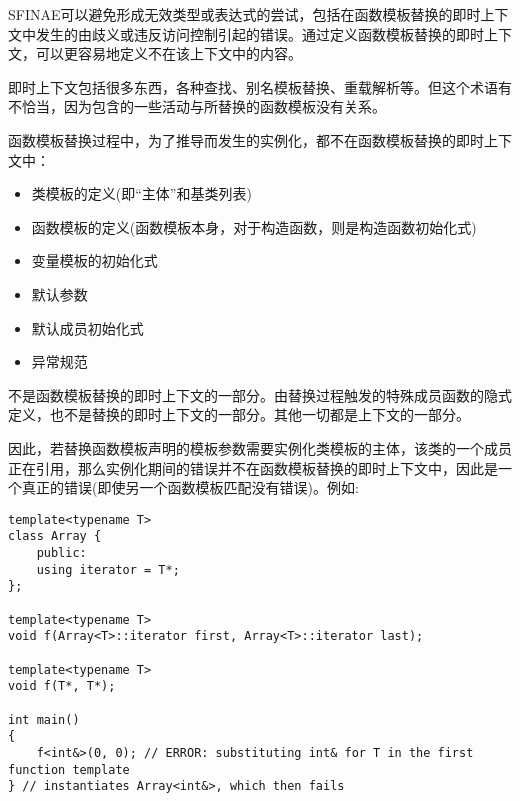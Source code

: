 
SFINAE可以避免形成无效类型或表达式的尝试，包括在函数模板替换的即时上下文中发生的由歧义或违反访问控制引起的错误。通过定义函数模板替换的即时上下文，可以更容易地定义不在该上下文中的内容。

\begin{tcolorbox}[colback=webgreen!5!white,colframe=webgreen!75!black]
\hspace*{0.75cm}即时上下文包括很多东西，各种查找、别名模板替换、重载解析等。但这个术语有不恰当，因为包含的一些活动与所替换的函数模板没有关系。
\end{tcolorbox}

函数模板替换过程中，为了推导而发生的实例化，都不在函数模板替换的即时上下文中：

\begin{itemize}
\item 
类模板的定义(即“主体”和基类列表)

\item 
函数模板的定义(函数模板本身，对于构造函数，则是构造函数初始化式)

\item 
变量模板的初始化式

\item 
默认参数

\item 
默认成员初始化式

\item 
异常规范
\end{itemize}

不是函数模板替换的即时上下文的一部分。由替换过程触发的特殊成员函数的隐式定义，也不是替换的即时上下文的一部分。其他一切都是上下文的一部分。

因此，若替换函数模板声明的模板参数需要实例化类模板的主体，该类的一个成员正在引用，那么实例化期间的错误并不在函数模板替换的即时上下文中，因此是一个真正的错误(即使另一个函数模板匹配没有错误)。例如:

\begin{lstlisting}[style=styleCXX]
template<typename T>
class Array {
	public:
	using iterator = T*;
};

template<typename T>
void f(Array<T>::iterator first, Array<T>::iterator last);

template<typename T>
void f(T*, T*);

int main()
{
	f<int&>(0, 0); // ERROR: substituting int& for T in the first function template
} // instantiates Array<int&>, which then fails
\end{lstlisting}

